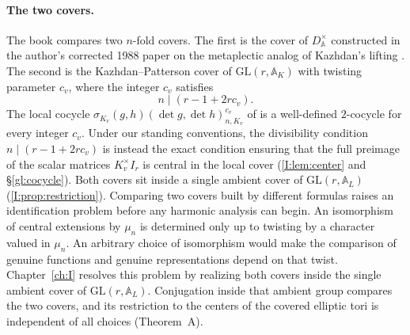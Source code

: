\documentclass[12pt,letterpaper,oneside]{book}
\theoremstyle{plain}
\theoremstyle{definition}
\begin{document}
\paragraph{The two covers.} The book compares two $n$-fold covers. The first is the cover of $D^\times_{\mathbb A}$ constructed in the author's corrected 1988 paper on the metaplectic analog of Kazhdan's lifting \cite{Jo88,JC26a}. The second is the Kazhdan--Patterson cover of $\mathrm{GL}(r,\mathbb A_K)$ with twisting parameter $c_v$, where the integer $c_v$ satisfies
\[
n \mid (r - 1 + 2rc_v).
\]
The local cocycle $\sigma_{K_v}(g,h)(\det g,\det h)_{n,K_v}^{c_v}$ of \cite{KP84} is a well-defined $2$-cocycle for every integer $c_v$. Under our standing conventions, the divisibility condition $n \mid (r - 1 + 2rc_v)$ is instead the exact condition ensuring that the full preimage of the scalar matrices $K_v^\times I_r$ is central in the local cover (\cref{I:lem:center} and \S\ref{gl:cocycle}). Both covers sit inside a single ambient cover of $\mathrm{GL}(r,\mathbb A_L)$ (\cref{I:prop:restriction}). Comparing two covers built by different formulas raises an identification problem before any harmonic analysis can begin. An isomorphism of central extensions by $\mu_n$ is determined only up to twisting by a character valued in $\mu_n$. An arbitrary choice of isomorphism would make the comparison of genuine functions and genuine representations depend on that twist. Chapter~\ref{ch:I} resolves this problem by realizing both covers inside the single ambient cover of $\mathrm{GL}(r,\mathbb A_L)$. Conjugation inside that ambient group compares the two covers, and its restriction to the centers of the covered elliptic tori is independent of all choices (Theorem~A).
\end{document}
